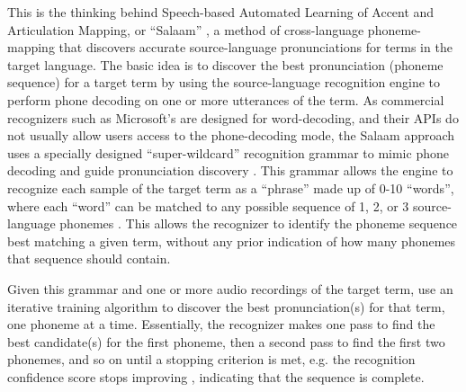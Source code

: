 \documentclass[11pt]{article}
\begin{document}
This is the thinking behind Speech-based Automated Learning of Accent and Articulation Mapping, or ``Salaam'' \cite{Sherwani09,Qiao10,Chan12}, a
method of cross-language phoneme-mapping 
that
discovers accurate source-language pronunciations for terms in the 
target language. 
The basic idea 
is to discover the best pronunciation (phoneme sequence) for a target term by using the source-language recognition engine to perform phone decoding on one or more utterances of the term. As commercial recognizers such as Microsoft's are designed for word-decoding, and their APIs do not usually allow users access to the phone-decoding mode, the Salaam approach uses a specially designed  ``super-wildcard'' recognition grammar 
to mimic phone decoding 
and guide pronunciation discovery \cite{Qiao10,Chan12}.
This grammar allows the engine to recognize each sample of the target term as a ``phrase'' made up of 0-10 ``words'',
where each ``word'' can be matched to any possible sequence of 1, 2, or 3 source-language phonemes \cite[Sec.~4.1]{Qiao10}. 
This allows the recognizer to identify the phoneme sequence best matching a given term, without any prior indication of how many phonemes that sequence should contain.

Given this grammar and one or more audio recordings of the target term,  use an iterative training algorithm to discover the best pronunciation(s) for that term, one phoneme at a time. 
Essentially, the recognizer makes one pass to find the best candidate(s) for the first phoneme, then a second pass to find the first two phonemes, and so on until a stopping criterion is met, e.g. the recognition confidence score 
stops improving \cite[p.~4]{Qiao10}, indicating that the sequence is complete.
\end{document}
